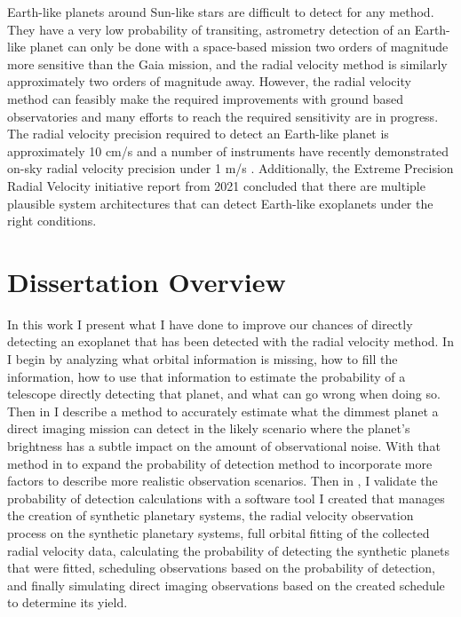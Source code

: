 Earth-like planets around Sun-like stars are difficult to detect for any
method. They have a very low probability of transiting, astrometry detection of
an Earth-like planet can only be done with a space-based mission two orders of
magnitude more sensitive than the Gaia mission, and the radial velocity method
is similarly approximately two orders of magnitude
away\citep{gaudiHabitableExoplanetObservatory2020}. However, the radial
velocity method can feasibly make the required improvements with ground based
observatories and many efforts to reach the required sensitivity are in
progress\citep{Fischer2016a}. The radial velocity precision required to 
detect an Earth-like planet is approximately 10 cm/s and a number of instruments
have recently demonstrated on-sky radial velocity precision under 1 m/s \citep{maroonx2021,
guptaTargetPrioritization2021,Pepe2021}. Additionally, the Extreme Precision
Radial Velocity initiative report from 2021 concluded that there are multiple
plausible system architectures that can detect Earth-like exoplanets under
the right conditions.


\section{Dissertation Overview}
\label{sec:dis_overview}

In this work I present what I have done to improve our chances of directly
detecting an exoplanet that has been detected with the radial velocity method.
In  I begin by analyzing what orbital information is
missing, how to fill the information, how to use that information to estimate
the probability of a telescope directly detecting that planet, and what can go
wrong when doing so. Then in  I describe a method to
accurately estimate what the dimmest planet a direct imaging mission can detect
in the likely scenario where the planet's brightness has a subtle impact on the
amount of observational noise. With that method in  to
expand the probability of detection method to incorporate more factors to
describe more realistic observation scenarios. Then in
, I validate the probability of detection
calculations with a software tool I created that manages the creation of
synthetic planetary systems, the radial velocity observation process on the
synthetic planetary systems, full orbital fitting of the collected radial
velocity data, calculating the probability of detecting the synthetic planets
that were fitted, scheduling observations based on the probability of
detection, and finally simulating direct imaging observations based on the
created schedule to determine its yield.


